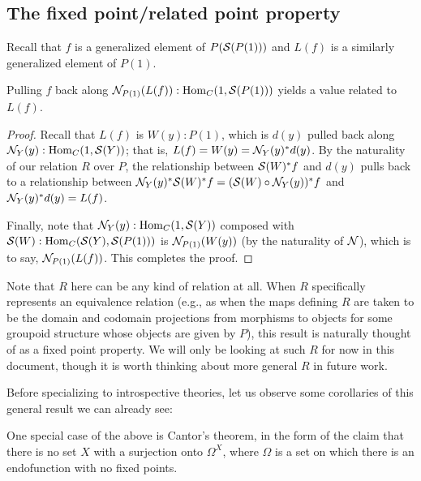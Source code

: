 \subsection{The fixed point/related point property}
Recall that $f$ is a generalized element of $P(\mathcal{S}(P(1)))$ and $L(f)$ is a similarly generalized element of $P(1)$.
\begin{theorem}
Pulling $f$ back along $\mathcal{N}_{P(1)}(L(f)) : \operatorname{Hom}_C(1, \mathcal{S}(P(1)))$ yields a value related to $L(f)$.
\end{theorem}
\begin{proof}
Recall that $L(f)$ is $W(y) : P(1)$, which is $d(y)$ pulled back along $\mathcal{N}_Y(y) : \operatorname{Hom}_C(1, \mathcal{S}(Y))$; that is, $L(f) = W(y) = \mathcal{N}_Y(y)^* d(y)$. By the naturality of our relation $R$ over $P$, the relationship between $\mathcal{S}(W)^*f$ and $d(y)$ pulls back to a relationship between $\mathcal{N}_Y(y)^* \mathcal{S}(W)^*f = (\mathcal{S}(W) \circ \mathcal{N}_Y(y))^* f$ and $\mathcal{N}_Y(y)^* d(y) = L(f)$.

Finally, note that $\mathcal{N}_Y(y) : \operatorname{Hom}_C(1, \mathcal{S}(Y))$ composed with $\mathcal{S}(W) : \operatorname{Hom}_C(\mathcal{S}(Y), \mathcal{S}(P(1)))$ is $\mathcal{N}_{P(1)}(W(y))$ (by the naturality of $\mathcal{N}$), which is to say, $\mathcal{N}_{P(1)}(L(f))$. This completes the proof.
\end{proof}

Note that $R$ here can be any kind of relation at all. When $R$ specifically represents an equivalence relation (e.g., as when the maps defining $R$ are taken to be the domain and codomain projections from morphisms to objects for some groupoid structure whose objects are given by $P$), this result is naturally thought of as a fixed point property. We will only be looking at such $R$ for now in this document, though it is worth thinking about more general $R$ in future work.

Before specializing to introspective theories, let us observe some corollaries of this general result we can already see:

\begin{observation}\label{CantorsTheorem}
One special case of the above is Cantor's theorem, in the form of the claim that there is no set $X$ with a surjection onto $\Omega^X$, where $\Omega$ is a set on which there is an endofunction with no fixed points. 
\end{observation}

